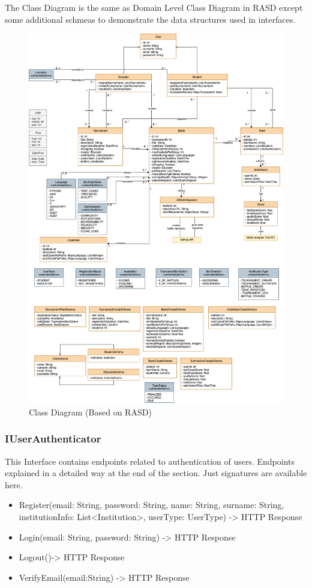 The Class Diagram is the same as Domain Level Class Diagram in RASD except some additional schmeas to demonstrate the data structures used in interfaces.
\begin{figure}[H]
    \centering
    \includegraphics[width=\linewidth]{Images/DD-Class Diagram.drawio.png}
    \caption{Class Diagram (Based on RASD)}
\end{figure}

\subsubsection{IUserAuthenticator}
This Interface contains endpoints related to authentication of users. Endpoints explained in a detailed way at the end of the section. Just signatures are available here.
\begin{itemize}
\item Register(email: String, password: String, name: String, surname: String, institutionInfo: List<Institution>, userType: UserType) -> HTTP Response
\item Login(email: String, password: String) -> HTTP Response
\item Logout()-> HTTP Response
\item VerifyEmail(email:String) -> HTTP Response
\end{itemize}

